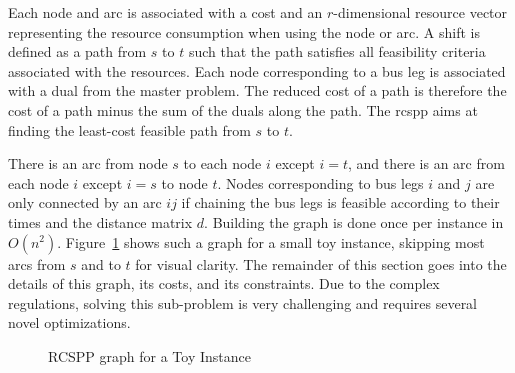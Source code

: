 \documentclass[]{amsart}
\theoremstyle{plain}
\begin{document}
Each node and arc is associated with a cost and an $r$-dimensional resource vector representing the resource consumption when using the node or arc. A shift is defined as a path from $s$ to $t$ such that the path satisfies all feasibility criteria associated with the resources. Each node corresponding to a bus leg is associated with a dual from the master problem. The reduced cost of a path is therefore the cost of a path minus the sum of the duals along the path. The \gls{rcspp} aims at finding the least-cost feasible path from $s$ to $t$.

There is an arc from node $s$ to each node $i$ except $i=t$, and there is an arc from each node $i$ except $i=s$ to node $t$. Nodes corresponding to bus legs $i$ and $j$ are only connected by an arc $ij$ if chaining the bus legs is feasible according to their times and the distance matrix $d$. Building the graph is done once per instance in $O(n^2)$. Figure~\ref{fig:rcspp} shows such a graph for a small toy instance, skipping most arcs from $s$ and to $t$ for visual clarity. The remainder of this section goes into the details of this graph, its costs, and its constraints. Due to the complex regulations, solving this sub-problem is very challenging and requires several novel optimizations.

\begin{figure}[htp]
\centering
{}
\caption{RCSPP graph for a Toy Instance}
\label{fig:rcspp}
\end{figure}
\end{document}
